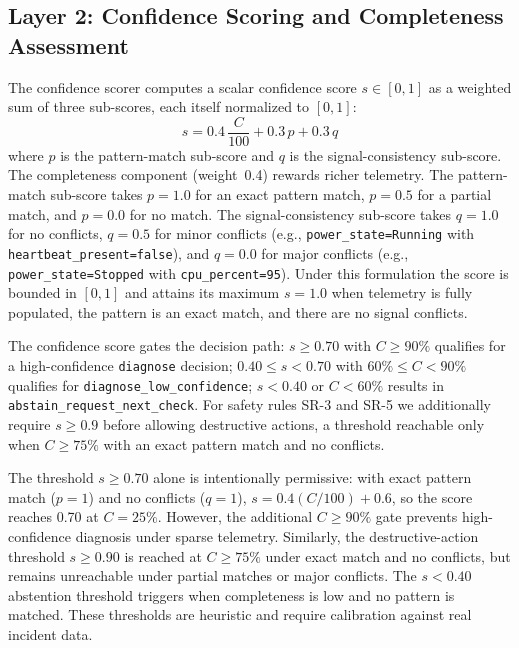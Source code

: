 \documentclass[a4paper,10pt,journal,compsoc]{IEEEtran}
\begin{document}
\subsection{Layer 2: Confidence Scoring and Completeness Assessment}

The confidence scorer computes a scalar confidence score
$s \in [0, 1]$ as a weighted sum of three sub-scores, each itself
normalized to $[0, 1]$:
\begin{equation}
  s = 0.4\,\frac{C}{100} + 0.3\,p + 0.3\,q
  \label{eq:confidence}
\end{equation}
where $p$ is the pattern-match sub-score and $q$ is the
signal-consistency sub-score. The completeness component (weight~0.4)
rewards richer telemetry. The pattern-match sub-score takes $p = 1.0$
for an exact pattern match, $p = 0.5$ for a partial match, and
$p = 0.0$ for no match. The signal-consistency sub-score takes
$q = 1.0$ for no conflicts, $q = 0.5$ for minor conflicts (e.g.,
\texttt{power\_state=Running} with
\texttt{heartbeat\_present=false}), and $q = 0.0$ for major conflicts
(e.g., \texttt{power\_state=Stopped} with \texttt{cpu\_percent=95}).
Under this formulation the score is bounded in $[0, 1]$ and attains
its maximum $s = 1.0$ when telemetry is fully populated, the pattern
is an exact match, and there are no signal conflicts.

The confidence score gates the decision path: $s \geq 0.70$ with
$C \geq 90\%$ qualifies for a high-confidence \texttt{diagnose}
decision; $0.40 \leq s < 0.70$ with $60\% \leq C < 90\%$ qualifies
for \texttt{diagnose\_low\_confidence}; $s < 0.40$ or $C < 60\%$
results in \texttt{abstain\_request\_next\_check}. For safety rules
SR-3 and SR-5 we additionally require $s \geq 0.9$ before allowing
destructive actions, a threshold reachable only when
$C \geq 75\%$ with an exact pattern match and no conflicts.

The threshold $s \geq 0.70$ alone is intentionally permissive: with
exact pattern match ($p=1$) and no conflicts ($q=1$),
$s = 0.4(C/100) + 0.6$, so the score reaches 0.70 at $C = 25\%$.
However, the additional $C \geq 90\%$ gate prevents high-confidence
diagnosis under sparse telemetry. Similarly, the destructive-action
threshold $s \geq 0.90$ is reached at $C \geq 75\%$ under exact match
and no conflicts, but remains unreachable under partial matches or
major conflicts. The $s < 0.40$ abstention threshold triggers when
completeness is low and no pattern is matched. These thresholds are
heuristic and require calibration against real incident data.
\end{document}
